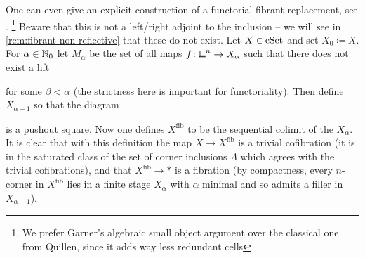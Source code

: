\begin{construction}
One can even give an explicit construction of a functorial fibrant replacement, see \cite[Remark 12.5.6]{Riehl}.%
\footnote{We prefer Garner's algebraic small object argument over the classical one from Quillen, since it adds way less redundant cells}
Beware that this is not a left/right adjoint to the inclusion -- we will see in \ref{rem:fibrant-non-reflective} that these do not exist.
Let $X\in\mathrm{cSet}$ and set $X_0\coloneqq X$.
For $\alpha\in{\mathbb{N}}_0$ let $M_\alpha$ be the set of all maps $f\colon{\bbcor}^n\to X_\alpha$
such that there does not exist a lift
\begin{center}
\end{center}
for some $\beta<\alpha$ (the strictness here is important for functoriality).
Then define $X_{\alpha+1}$ so that the diagram
\begin{center}
\end{center}
is a pushout square.
Now one defines $X^\mathrm{fib}$ to be the sequential colimit of the $X_\alpha$.
It is clear that with this definition the map $X\to X^\mathrm{fib}$ is a trivial cofibration
(it is in the saturated class of the set of corner inclusions $\Lambda$ which agrees with the trivial cofibrations),
and that $X^\mathrm{fib}\to\ast$ is a fibration
(by compactness, every $n$-corner in $X^\mathrm{fib}$ lies in a finite stage $X_\alpha$
with $\alpha$ minimal and so admits a filler in $X_{\alpha+1}$).
\end{construction}

